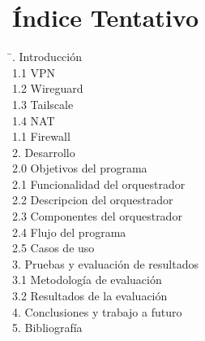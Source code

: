 \documentclass[letterpaper,12pt,oneside]{book}
\begin{document}
\section{Índice Tentativo}
\begin{flushleft}
    \begin{tabbing}
    \hspace{4cm} \= . Introducción \> \dotfill  \\
    \hspace{0.5cm}1.1 VPN \> \dotfill  \\
    \hspace{0.5cm}1.2 Wireguard \> \dotfill  \\
    \hspace{0.5cm}1.3 Tailscale \> \dotfill  \\
    \hspace{0.5cm}1.4 NAT \> \dotfill  \\
    \hspace{0.5cm}1.1 Firewall \> \dotfill  \\

    2. Desarrollo \> \dotfill  \\

    \hspace{0.5cm}2.0 Objetivos del programa \> \dotfill  \\
    \hspace{0.5cm}2.1 Funcionalidad del orquestrador \> \dotfill  \\
    \hspace{0.5cm}2.2 Descripcion del orquestrador \> \dotfill  \\
    \hspace{0.5cm}2.3 Componentes del orquestrador \> \dotfill  \\
    \hspace{0.5cm}2.4 Flujo del programa \> \dotfill  \\
    \hspace{0.5cm}2.5 Casos de uso \> \dotfill  \\
    
    3. Pruebas y evaluación de resultados \> \dotfill \\
    \hspace{0.5cm}3.1 Metodología de evaluación \>  \\
    \hspace{0.5cm}3.2 Resultados de la evaluación \>  \\
    4. Conclusiones y trabajo a futuro \> \dotfill  \\
    5. Bibliografía \>  \\
    \end{tabbing}
    \end{flushleft}
\end{document}
